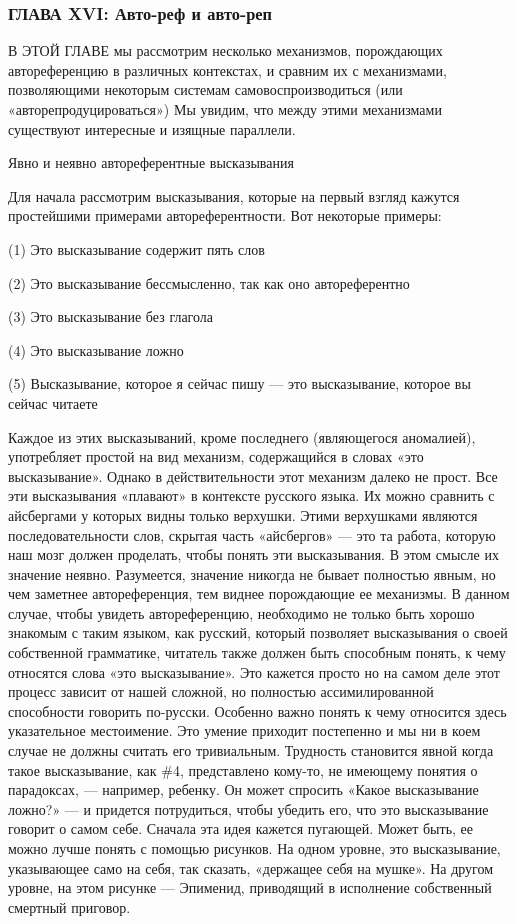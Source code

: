 \subsubsection{ГЛАВА XVI: Авто-реф и авто-реп}

В ЭТОЙ ГЛАВЕ мы рассмотрим несколько механизмов, порождающих автореференцию в различных контекстах, и сравним их с механизмами, позволяющими некоторым системам самовоспроизводиться (или «авторепродуцироваться») Мы увидим, что между этими механизмами существуют интересные и изящные параллели.

Явно и неявно автореферентные высказывания

Для начала рассмотрим высказывания, которые на первый взгляд кажутся простейшими примерами автореферентности. Вот некоторые примеры:

(1) Это высказывание содержит пять слов

(2) Это высказывание бессмысленно, так как оно автореферентно

(3) Это высказывание без глагола

(4) Это высказывание ложно

(5) Высказывание, которое я сейчас пишу --- это высказывание, которое вы сейчас читаете

Каждое из этих высказываний, кроме последнего (являющегося аномалией), употребляет простой на вид механизм, содержащийся в словах «это высказывание». Однако в действительности этот механизм далеко не прост. Все эти высказывания «плавают» в контексте русского языка. Их можно сравнить с айсбергами у которых видны только верхушки. Этими верхушками являются последовательности слов, скрытая часть «айсбергов» --- это та работа, которую наш мозг должен проделать, чтобы понять эти высказывания. В этом смысле их значение неявно. Разумеется, значение никогда не бывает полностью явным, но чем заметнее автореференция, тем виднее порождающие ее механизмы. В данном случае, чтобы увидеть автореференцию, необходимо не только быть хорошо знакомым с таким языком, как русский, который позволяет высказывания о своей собственной грамматике, читатель также должен быть способным понять, к чему относятся слова «это высказывание». Это кажется просто но на самом деле этот процесс зависит от нашей сложной, но полностью ассимилированной способности говорить по-русски. Особенно важно понять к чему относится здесь указательное местоимение. Это умение приходит постепенно и мы ни в коем случае не должны считать его тривиальным. Трудность становится явной когда такое высказывание, как \#4, представлено кому-то, не имеющему понятия о парадоксах, --- например, ребенку. Он может спросить «Какое высказывание ложно?» --- и придется потрудиться, чтобы убедить его, что это высказывание говорит о самом себе. Сначала эта идея кажется пугающей. Может быть, ее можно лучше понять с помощью рисунков. На одном уровне, это высказывание, указывающее само на себя, так сказать, «держащее себя на мушке». На другом уровне, на этом рисунке --- Эпименид, приводящий в исполнение собственный смертный приговор.


